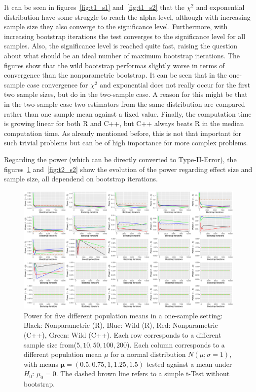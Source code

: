 It can be seen in figures~\ref{fig:t1_s1} and~\ref{fig:t1_s2} that the $\chi^2$ and exponential distribution have some struggle to reach the alpha-level, although with increasing sample size they also converge to the significance level. Furthermore, with increasing bootstrap iterations the test converges to the significance level for all samples. Also, the significance level is reached quite fast, raising the question about what should be an ideal number of maximum bootstrap iterations. The figures show that the wild bootstrap performas slightly worse in terms of convergence than the nonparametric bootstrap. It can be seen that in the one-sample case convergence for $\chi^2$ and exponential does not really occur for the first two sample sizes, but do in the two-sample case. A reason for this might be that in the two-sample case two estimators from the same distribution are compared rather than one sample mean against a fixed value. Finally, the computation time is growing linear for both R and C++, but C++ always beats R in the median computation time. As already mentioned before, this is not that important for such trivial problems but can be of high importance for more complex problems. 

Regarding the power (which can be directly converted to Type-II-Error), the figures~\ref{fig:t2_s1} and~\ref{fig:t2_s2} show the evolution of the power regarding effect size and sample size, all dependend on bootstrap iterations. 

\begin{figure}
 \centering
	\includegraphics[scale=0.4]{./figures/plot_t2s1.pdf}
	\caption[Power One Sample]{Power for five different population means in a one-sample setting: Black: Nonparametric (R), Blue: Wild (R), Red: Nonparametric (C++), Green: Wild (C++). Each row corresponds to a different sample size from($5, 10, 50, 100, 200$). Each column corresponds to a different population mean $\mu$ for a normal distribution $N(\mu; \sigma = 1)$, with means $\mathbf{\mu} = (0.5, 0.75, 1, 1.25, 1.5)$ tested against a mean under $H_0$: $\mu_0 = 0$. The dashed brown line refers to a simple t-Test without bootstrap.}
	\label{fig:t2_s1}
\end{figure}



